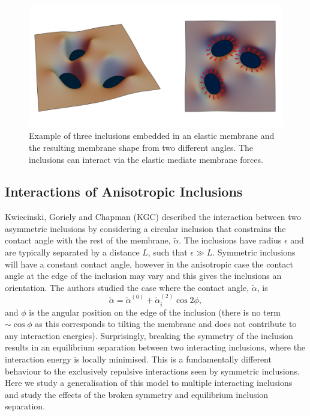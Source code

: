 \begin{figure}[h]
\centering
\includegraphics[width=12cm]{figures/3-elastic-figs/threeinc_scheme.pdf}
\caption{Example of three inclusions embedded in an elastic membrane and the resulting membrane shape from two different angles. The inclusions can interact via the elastic mediate membrane forces.}
\label{fig:overview}
\end{figure}

\subsection{Interactions of Anisotropic Inclusions}

Kwiecinski, Goriely and Chapman (KGC)\cite{kwiecinski_interactions_2020} described the interaction between two asymmetric inclusions by considering a circular inclusion that constrains the contact angle with the rest of the membrane, $\tilde{\alpha}$. The inclusions have radius $\epsilon$ and are typically separated by a distance $L$, such that $\epsilon \gg L$. Symmetric inclusions will have a constant contact angle, however in the anisotropic case the contact angle at the edge of the inclusion may vary and this gives the inclusions an orientation. The authors studied the case where the contact angle, $\tilde{\alpha}$, is
\begin{equation}
    \tilde{\alpha}=\tilde{\alpha}^{(0)} + \tilde{\alpha}^{(2)}_i\cos2\phi,
\end{equation}
and $\phi$ is the angular position on the edge of the inclusion (there is no term $\sim\cos\phi$ as this corresponds to tilting the membrane and does not contribute to any interaction energies). Surprisingly, breaking the symmetry of the inclusion results in an equilibrium separation between two interacting inclusions, where the interaction energy is locally minimised. This is a fundamentally different behaviour to the exclusively repulsive interactions seen by symmetric inclusions. Here we study a generalisation of this model to multiple interacting inclusions and study the effects of the broken symmetry and equilibrium inclusion separation.

